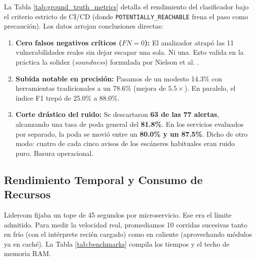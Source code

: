 \documentclass[conference]{IEEEtran}
\begin{document}
La Tabla \ref{tab:ground_truth_metrics} detalla el rendimiento del clasificador bajo el criterio estricto de CI/CD (donde \texttt{POTENTIALLY\_REACHABLE} frena el paso como precaución). Los datos arrojan conclusiones directas:
\begin{enumerate}
    \item \textbf{Cero falsos negativos críticos ($FN = 0$):} El analizador atrapó las 11 vulnerabilidades reales sin dejar escapar una sola. Ni una. Esto valida en la práctica la solidez (\textit{soundness}) formulada por Nielson et al. \cite{nielson1999principles}.
    \item \textbf{Subida notable en precisión:} Pasamos de un modesto 14.3\% con herramientas tradicionales a un 78.6\% (mejora de $5.5\times$). En paralelo, el índice F1 trepó de 25.0\% a 88.0\%.
    \item \textbf{Corte drástico del ruido:} Se descartaron \textbf{63 de las 77 alertas}, alcanzando una tasa de poda general del \textbf{81.8\%}. En los servicios evaluados por separado, la poda se movió entre un \textbf{80.0\% y un 87.5\%}. Dicho de otro modo: cuatro de cada cinco avisos de los escáneres habituales eran ruido puro. Basura operacional.
\end{enumerate}

\subsection{Rendimiento Temporal y Consumo de Recursos}
Lidercom fijaba un tope de 45 segundos por microservicio. Ese era el límite admitido. Para medir la velocidad real, promediamos 10 corridas sucesivas tanto en frío (con el intérprete recién cargado) como en caliente (aprovechando módulos ya en caché). La Tabla \ref{tab:benchmarks} compila los tiempos y el techo de memoria RAM.
\end{document}
